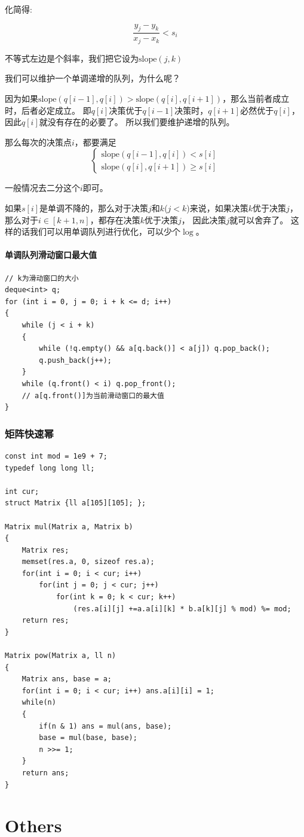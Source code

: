 \documentclass[twoside]{article}
\begin{document}
化简得:

$$\frac{y_j - y_k}{x_j - x_k} < s_i$$

不等式左边是个斜率，我们把它设为$\text{slope}(j,k)$

我们可以维护一个单调递增的队列，为什么呢？

因为如果$\text{slope}(q[i-1],q[i]) > \text{slope}(q[i],q[i+1])$，那么当前者成立时，后者必定成立。 即$q[i]$决策优于$q[i-1]$决策时，$q[i+1]$必然优于$q[i]$，因此$q[i]$就没有存在的必要了。 所以我们要维护递增的队列。

那么每次的决策点$i$，都要满足
$$\begin{cases}
    \text{slope}(q[i-1],q[i]) < s[i] \\
    \text{slope}(q[i],q[i+1]) \ge s[i]
\end{cases}$$

一般情况去二分这个$i$即可。

如果$s[i]$是单调不降的，那么对于决策$j$和$k$($j < k$)来说，如果决策$k$优于决策$j$，那么对于$i \in [k+1,n]$，都存在决策$k$优于决策$j$， 因此决策$j$就可以舍弃了。 这样的话我们可以用单调队列进行优化，可以少个$\log$。

\paragraph{单调队列滑动窗口最大值}
\begin{lstlisting}
// k为滑动窗口的大小
deque<int> q;
for (int i = 0, j = 0; i + k <= d; i++)
{
    while (j < i + k)
    {
        while (!q.empty() && a[q.back()] < a[j]) q.pop_back();
        q.push_back(j++);
    }
    while (q.front() < i) q.pop_front();
    // a[q.front()]为当前滑动窗口的最大值
}
\end{lstlisting}\subsubsection{矩阵快速幂}
\begin{lstlisting}
const int mod = 1e9 + 7;
typedef long long ll;

int cur;
struct Matrix {ll a[105][105]; };

Matrix mul(Matrix a, Matrix b)
{
    Matrix res;
    memset(res.a, 0, sizeof res.a);
    for(int i = 0; i < cur; i++)
        for(int j = 0; j < cur; j++)
            for(int k = 0; k < cur; k++)
                (res.a[i][j] +=a.a[i][k] * b.a[k][j] % mod) %= mod;
    return res;
}

Matrix pow(Matrix a, ll n)
{
    Matrix ans, base = a;
    for(int i = 0; i < cur; i++) ans.a[i][i] = 1;
    while(n)
    {
        if(n & 1) ans = mul(ans, base);
        base = mul(base, base);
        n >>= 1;
    }
    return ans;
}\end{lstlisting}
\clearpage\section{Others}
\end{document}
